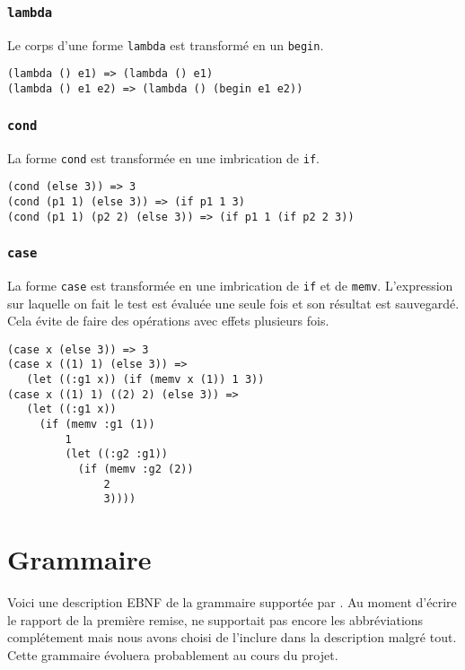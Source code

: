 \documentclass[11pt]{report}
\begin{document}
\subsection{\tt lambda}

Le corps d'une forme {\tt lambda} est transformé en un {\tt begin}.

\begin{verbatim}
(lambda () e1) => (lambda () e1)
(lambda () e1 e2) => (lambda () (begin e1 e2))
\end{verbatim}


\subsection{\tt cond}

La forme {\tt cond} est transformée en une imbrication de {\tt if}.


\begin{verbatim}
(cond (else 3)) => 3
(cond (p1 1) (else 3)) => (if p1 1 3)
(cond (p1 1) (p2 2) (else 3)) => (if p1 1 (if p2 2 3))
\end{verbatim}


\subsection{\tt case}

La forme {\tt case} est transformée en une imbrication de {\tt if} et
de {\tt memv}. L'expression sur laquelle on fait le test est évaluée
une seule fois et son résultat est sauvegardé.  Cela évite de faire
des opérations avec effets plusieurs fois.


\begin{verbatim}
(case x (else 3)) => 3
(case x ((1) 1) (else 3)) =>
   (let ((:g1 x)) (if (memv x (1)) 1 3))
(case x ((1) 1) ((2) 2) (else 3)) =>
   (let ((:g1 x))
     (if (memv :g1 (1))
         1
         (let ((:g2 :g1))
           (if (memv :g2 (2))
               2
               3))))
\end{verbatim}






\appendix
\chapter{Grammaire}
\label{grammaire}
Voici une description EBNF de la grammaire supportée par \sins{}. Au
moment d'écrire le rapport de la première remise, \sins{} ne
supportait pas encore les abbréviations complétement mais nous avons
choisi de l'inclure dans la description malgré tout. Cette grammaire
évoluera probablement au cours du projet.
\end{document}
